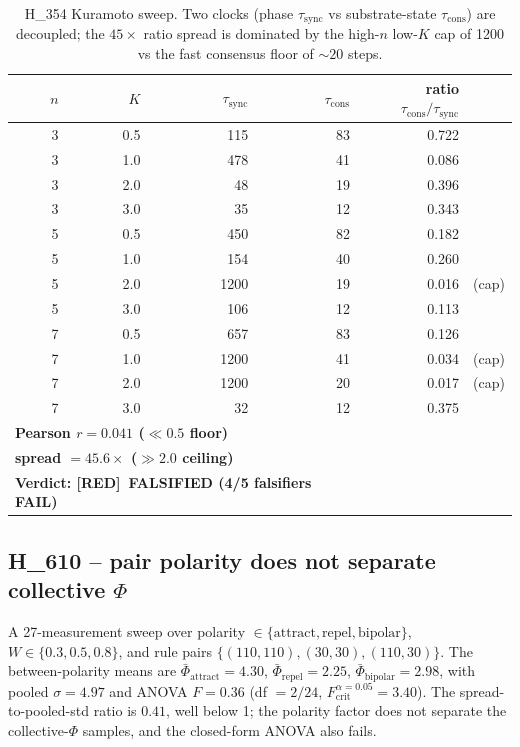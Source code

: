 \documentclass[11pt,a4paper]{article}
\providecommand{\tierRed}{\textbf{[RED]}}
\begin{document}
\begin{table}[h]
\centering
\small
\begin{tabular}{rrrrrr}
\toprule
\textbf{$n$} & \textbf{$K$} & \textbf{$\tau_{\mathrm{sync}}$}
& \textbf{$\tau_{\mathrm{cons}}$}
& \textbf{ratio $\tau_{\mathrm{cons}}/\tau_{\mathrm{sync}}$} & \\
\midrule
3 & 0.5 &  115 & 83 & 0.722 & \\
3 & 1.0 &  478 & 41 & 0.086 & \\
3 & 2.0 &   48 & 19 & 0.396 & \\
3 & 3.0 &   35 & 12 & 0.343 & \\
5 & 0.5 &  450 & 82 & 0.182 & \\
5 & 1.0 &  154 & 40 & 0.260 & \\
5 & 2.0 & 1200 & 19 & 0.016 & (cap) \\
5 & 3.0 &  106 & 12 & 0.113 & \\
7 & 0.5 &  657 & 83 & 0.126 & \\
7 & 1.0 & 1200 & 41 & 0.034 & (cap) \\
7 & 2.0 & 1200 & 20 & 0.017 & (cap) \\
7 & 3.0 &   32 & 12 & 0.375 & \\
\midrule
\multicolumn{4}{l}{\textbf{Pearson $r = 0.041$ ($\ll 0.5$ floor)}} & & \\
\multicolumn{4}{l}{\textbf{spread $= 45.6\times$ ($\gg 2.0$ ceiling)}} & & \\
\multicolumn{4}{l}{\textbf{Verdict: \tierRed\ FALSIFIED (4/5 falsifiers FAIL)}} & & \\
\bottomrule
\end{tabular}
\caption{H\_354 Kuramoto sweep. Two clocks (phase $\tau_{\mathrm{sync}}$
vs substrate-state $\tau_{\mathrm{cons}}$) are decoupled; the
$45\times$ ratio spread is dominated by the high-$n$ low-$K$ cap of
1200 vs the fast consensus floor of $\sim 20$ steps.}
\label{tab:h354}
\end{table}

\subsection{H\_610 -- pair polarity does not separate collective $\Phi$}
\label{sec:h610}

A 27-measurement sweep over polarity $\in \{\text{attract},
\text{repel}, \text{bipolar}\}$, $W \in \{0.3, 0.5, 0.8\}$, and rule
pairs $\{(110,110), (30,30), (110,30)\}$. The between-polarity
means are
$\bar\Phi_{\mathrm{attract}} = 4.30$,
$\bar\Phi_{\mathrm{repel}} = 2.25$,
$\bar\Phi_{\mathrm{bipolar}} = 2.98$,
with pooled $\sigma = 4.97$ and ANOVA $F = 0.36$
(df $= 2/24$, $F_{\mathrm{crit}}^{\alpha=0.05} = 3.40$).
The spread-to-pooled-std ratio is $0.41$, well below 1; the
polarity factor does not separate the collective-$\Phi$ samples,
and the closed-form ANOVA also fails.
\end{document}

